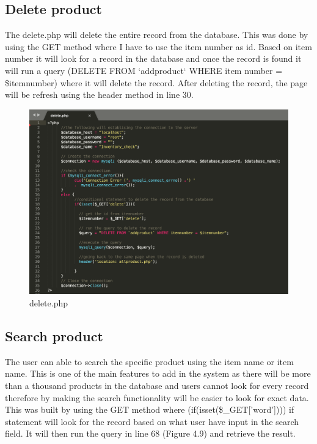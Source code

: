\subsection{Delete product}
The delete.php will delete the entire record from the database. This was done by using the GET method where I have to use the item number as id. Based on item number it will look for a record in the database and once the record is found it will run a query (DELETE FROM `addproduct` WHERE item number = \$itemnumber) where it will delete the record. After deleting the record, the page will be refresh using the header method in line 30.
\begin{figure}[H]
\centering
    \includegraphics[scale=0.48]
    {implement_image/delete.png}
    \caption{delete.php}
    \label{fig:delete.php}
\end{figure}

\subsection{Search product}
The user can able to search the specific product using the item name or item name. This is one of the main features to add in the system as there will be more than a thousand products in the database and users cannot look for every record therefore by making the search functionality will be easier to look for exact data. This was built by using the GET method where (if(isset(\$\_GET['word']))) if statement will look for the record based on what user have input in the search field. It will then run the query in line 68 (Figure 4.9) and retrieve the result.

